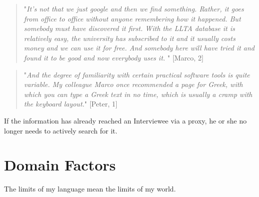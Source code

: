 \documentclass[12pt, a4paper, titlepage, oneside, abstract=true, toc=listof, toc=bibliography]{scrreprt}
\begin{document}
{\begin{quotation}
"\textit{It's not that we just google and then we find something. Rather, it goes from office to office without anyone remembering how it happened. But somebody must have discovered it first. With the LLTA database it is relatively easy, the university has subscribed to it and it usually costs money and we can use it for free. And somebody here will have tried it and found it to be good and now everybody uses it.} " [Marco, 2]
\end{quotation}

\begin{quotation}
"\textit{And the degree of familiarity with certain practical software tools is quite variable. My colleague Marco once recommended a page for Greek, with which you can type a Greek text in no time, which is usually a cramp with the keyboard layout.}" [Peter, 1]
\end{quotation}

If the information has already reached an Interviewee via a proxy, he or she no longer needs to actively search for it.


\section{Domain Factors}
\label{sec:Domain_Factors}

The limits of my language mean the limits of my world. \citep{Wittgenstein1990}






}
\end{document}
